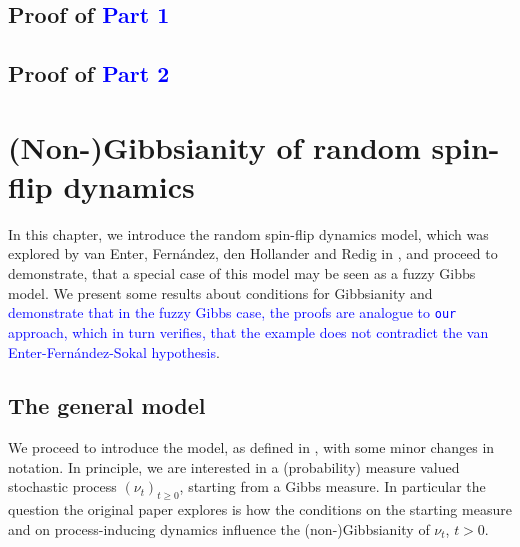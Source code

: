 \documentclass[12pt]{article}
\newcommand{\1}{\mathbbm{1}}
\newcommand{\5}{\vspace{0.5cm}}
\theoremstyle{definition}
\begin{document}

\subsection{Proof of \textcolor{blue}{Part 1}}


\subsection{Proof of \textcolor{blue}{Part 2}}


\pagebreak


\section{(Non-)Gibbsianity of random spin-flip dynamics}

In this chapter, we introduce the random spin-flip dynamics model, which was explored by van Enter, Fern\'andez, den Hollander and Redig in \cite{EFHR}, and proceed to demonstrate, that a special case of this model may be seen as a fuzzy Gibbs model. We present some results about conditions for Gibbsianity and \textcolor{blue}{demonstrate that in the fuzzy Gibbs case, the proofs are analogue to \texttt{our} approach, which in turn verifies, that the example does not contradict the van Enter-Fern\'andez-Sokal hypothesis}.


\subsection{The general model}

We proceed to introduce the model, as defined in \cite{EFHR}, with some minor changes in notation. In principle, we are interested in a (probability) measure valued stochastic process $(\nu_t)_{t\geq 0}$, starting from a Gibbs measure. In particular the question the original paper explores is how the conditions on the starting measure and on process-inducing dynamics influence the (non-)Gibbsianity of $\nu_t$, $t>0$. \\
\end{document}

